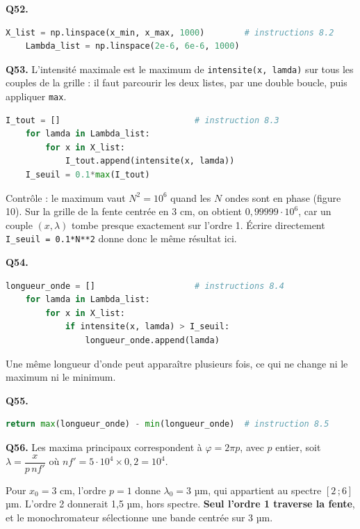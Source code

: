\documentclass[11pt,a4paper]{article}
\begin{document}
\textbf{Q52.}

\begin{lstlisting}[language=Python]
    X_list = np.linspace(x_min, x_max, 1000)        # instructions 8.2
    Lambda_list = np.linspace(2e-6, 6e-6, 1000)
\end{lstlisting}

\textbf{Q53.} L'intensité maximale est le maximum de \texttt{intensite(\allowbreak{}x,\allowbreak{}\ lamda)\allowbreak{}} sur tous les couples de la grille : il faut parcourir les deux listes, par une double boucle, puis appliquer \texttt{max}.

\begin{lstlisting}[language=Python]
    I_tout = []                           # instruction 8.3
    for lamda in Lambda_list:
        for x in X_list:
            I_tout.append(intensite(x, lamda))
    I_seuil = 0.1*max(I_tout)
\end{lstlisting}

Contrôle : le maximum vaut \(N^2=10^6\) quand les \(N\) ondes sont en phase (figure 10). Sur la grille de la fente centrée en 3 cm, on obtient \(0{,}99999\cdot10^6\), car un couple \((x,\lambda)\) tombe presque exactement sur l'ordre 1. Écrire directement \texttt{I\_seuil\ =\allowbreak{}\ 0.1*N**2} donne donc le même résultat ici.

\textbf{Q54.}

\begin{lstlisting}[language=Python]
    longueur_onde = []                    # instructions 8.4
    for lamda in Lambda_list:
        for x in X_list:
            if intensite(x, lamda) > I_seuil:
                longueur_onde.append(lamda)
\end{lstlisting}

Une même longueur d'onde peut apparaître plusieurs fois, ce qui ne change ni le maximum ni le minimum.

\textbf{Q55.}

\begin{lstlisting}[language=Python]
    return max(longueur_onde) - min(longueur_onde)  # instruction 8.5
\end{lstlisting}

\textbf{Q56.} Les maxima principaux correspondent à \(\varphi=2\pi p\), avec \(p\) entier, soit \(\lambda=\dfrac{x}{p\,nf'}\) où \(nf'=5\cdot10^4\times0{,}2=10^4\).

Pour \(x_0=3\) cm, l'ordre \(p=1\) donne \(\lambda_0=3\) µm, qui appartient au spectre \([2\,;6]\) µm. L'ordre 2 donnerait 1,5 µm, hors spectre. \textbf{Seul l'ordre 1 traverse la fente}, et le monochromateur sélectionne une bande centrée sur 3 µm.
\end{document}
